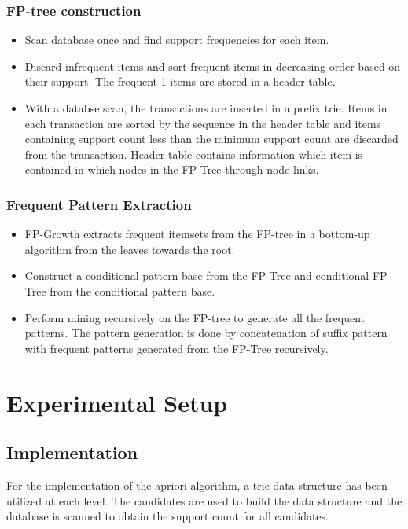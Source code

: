 \documentclass[12pt]{article}
\begin{document}
\subsubsection{FP-tree construction}
\begin{itemize}
	\item Scan database once and find support frequencies for each item.
	\item Discard infrequent items and sort frequent items in decreasing order based on their support. The frequent 1-items are stored in a header table.
	\item With a databse scan, the transactions are inserted in a prefix trie. Items in each transaction are sorted by the sequence in the header table and items containing support count less than the minimum support count are discarded from the transaction. Header table contains information which item is contained in which nodes in the FP-Tree through node links.
	
\end{itemize}

\subsubsection{Frequent Pattern Extraction}
\begin{itemize}
	\item FP-Growth extracts frequent itemsets from the FP-tree in a bottom-up algorithm from the leaves towards the root.
	\item Construct a conditional pattern base from the FP-Tree and conditional FP-Tree from the conditional pattern base.
	\item Perform mining recursively on the FP-tree to generate all the frequent patterns. The pattern generation is done by concatenation of suffix pattern with frequent patterns generated from the FP-Tree recursively.
	
\end{itemize}

\section{Experimental Setup}
\subsection{Implementation}

For the implementation of the apriori algorithm, a trie data structure has been utilized at each level. The candidates are used to build the data structure and the database is scanned to obtain the support count for all candidates. 
\end{document}
